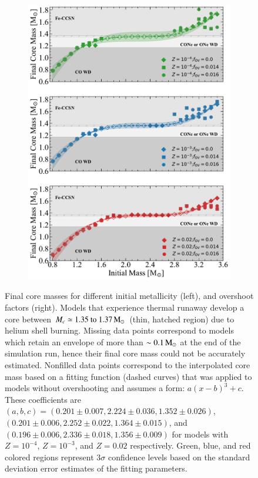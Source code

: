 \documentclass[main.tex]{subfiles}
\begin{document}
\begin{figure}[h!]
    \begin{subfigure}{.5\textwidth}
        \centering
        \includegraphics[width=0.95\columnwidth]{figures/chapter2/core_growth/series1_coreGrowth_panel2_interpolated.pdf}
    \end{subfigure}
    \caption{Final core masses for different initial metallicity (left), and overshoot factors (right).
    Models that experience thermal runaway develop a core between $M_c \simeq \numrange{1.35}{1.37}\msun$ 
    (thin, hatched region) due to helium shell burning. Missing data points correspond to models which retain an 
    envelope of more than $\sim 0.1\mathrm{\,M_\odot}$ at the end of the simulation run, hence their final core mass could not be 
    accurately estimated. Nonfilled data points correspond to the interpolated core mass based on a fitting function
    (dashed curves) that was applied to models without overshooting and assumes a form: $a(x-b)^3 + c$. 
    These coefficients are $(a,b,c) = (0.201 \pm 0.007, 2.224 \pm 0.036, 1.352 \pm 0.026)$, $(0.201 \pm 0.006, 2.252 \pm 0.022, 1.364 \pm 0.015)$, and $(0.196 \pm 0.006, 2.336 \pm 0.018, 1.356 \pm 0.009)$ 
    for models with $Z = 10^{-4}$, $Z=10^{-3}$, and $Z=0.02$ respectively. Green, blue, and red colored regions represent $3\sigma$ confidence levels based on the standard deviation error estimates of the fitting parameters.}
    \label{fig:coreGrowth}
\end{figure}
\end{document}
